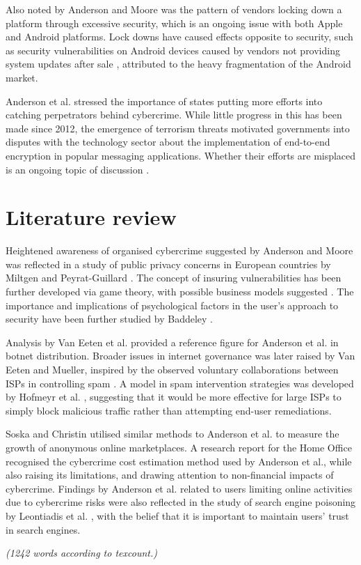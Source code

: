 \documentclass[11pt]{article}
\begin{document}
Also noted by Anderson and Moore \cite[Sec. 3]{anderson2009information} was the pattern of vendors locking down a platform through excessive security, which is an ongoing issue with both Apple and Android platforms. Lock downs have caused effects opposite to security, such as security vulnerabilities on Android devices caused by vendors not providing system updates after sale \cite{zhou2014peril}, attributed to the heavy fragmentation of the Android market.

Anderson et al. \cite[12.6]{anderson2013measuring} stressed the importance of states putting more efforts into catching perpetrators behind cybercrime. While little progress in this has been made since 2012, the emergence of terrorism threats motivated governments into disputes with the technology sector about the implementation of end-to-end encryption in popular messaging applications. Whether their efforts are misplaced is an ongoing topic of discussion \cite{cryptowar}.

\section{Literature review}

Heightened awareness of organised cybercrime suggested by Anderson and Moore \cite{anderson2009information} was reflected in a study of public privacy concerns in European countries by Miltgen and Peyrat-Guillard \cite{miltgen2014cultural}. The concept of insuring vulnerabilities has been further developed via game theory, with possible business models suggested \cite{pal2012cyberinsurance}. The importance and implications of psychological factors in the user's approach to security have been further studied by Baddeley \cite{baddeley2011information}.

Analysis by Van Eeten et al. \cite{van2010role} provided a reference figure for Anderson et al. \cite[12.4.1]{anderson2013measuring} in botnet distribution. Broader issues in internet governance was later raised by Van Eeten and Mueller, inspired by the observed voluntary collaborations between ISPs in controlling spam \cite[p. 730]{van2013governance}. A model in spam intervention strategies was developed by Hofmeyr et al. \cite{hofmeyr2013modeling}, suggesting that it would be more effective for large ISPs to simply block malicious traffic rather than attempting end-user remediations. 

Soska and Christin \cite{soska2015measuring} utilised similar methods to Anderson et al. \cite{anderson2013measuring} to measure the growth of anonymous online marketplaces. A research report for the Home Office \cite{mcguire2013cyber} recognised the cybercrime cost estimation method used by Anderson et al., while also raising its limitations, and drawing attention to non-financial impacts of cybercrime. Findings by Anderson et al. related to users limiting online activities due to cybercrime risks \cite[12.3.2]{anderson2013measuring} were also reflected in the study of search engine poisoning by Leontiadis et al. \cite{leontiadis2014nearly}, with the belief that it is important to maintain users' trust in search engines.

\emph{(1242 words according to texcount.)}


\footnotesize{}
\end{document}
